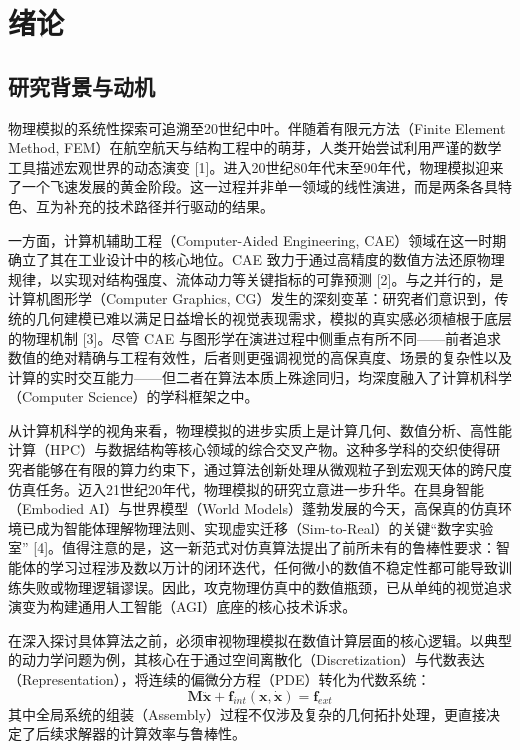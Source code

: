 \chapter{绪论}

\section{研究背景与动机}
物理模拟的系统性探索可追溯至20世纪中叶。伴随着有限元方法（Finite Element Method, FEM）在航空航天与结构工程中的萌芽，人类开始尝试利用严谨的数学工具描述宏观世界的动态演变 [1]。进入20世纪80年代末至90年代，物理模拟迎来了一个飞速发展的黄金阶段。这一过程并非单一领域的线性演进，而是两条各具特色、互为补充的技术路径并行驱动的结果。

一方面，计算机辅助工程（Computer-Aided Engineering, CAE）领域在这一时期确立了其在工业设计中的核心地位。CAE 致力于通过高精度的数值方法还原物理规律，以实现对结构强度、流体动力等关键指标的可靠预测 [2]。与之并行的，是计算机图形学（Computer Graphics, CG）发生的深刻变革：研究者们意识到，传统的几何建模已难以满足日益增长的视觉表现需求，模拟的真实感必须植根于底层的物理机制 [3]。尽管 CAE 与图形学在演进过程中侧重点有所不同——前者追求数值的绝对精确与工程有效性，后者则更强调视觉的高保真度、场景的复杂性以及计算的实时交互能力——但二者在算法本质上殊途同归，均深度融入了计算机科学（Computer Science）的学科框架之中。

从计算机科学的视角来看，物理模拟的进步实质上是计算几何、数值分析、高性能计算（HPC）与数据结构等核心领域的综合交叉产物。这种多学科的交织使得研究者能够在有限的算力约束下，通过算法创新处理从微观粒子到宏观天体的跨尺度仿真任务。迈入21世纪20年代，物理模拟的研究立意进一步升华。在具身智能（Embodied AI）与世界模型（World Models）蓬勃发展的今天，高保真的仿真环境已成为智能体理解物理法则、实现虚实迁移（Sim-to-Real）的关键“数字实验室” [4]。值得注意的是，这一新范式对仿真算法提出了前所未有的鲁棒性要求：智能体的学习过程涉及数以万计的闭环迭代，任何微小的数值不稳定性都可能导致训练失败或物理逻辑谬误。因此，攻克物理仿真中的数值瓶颈，已从单纯的视觉追求演变为构建通用人工智能（AGI）底座的核心技术诉求。

在深入探讨具体算法之前，必须审视物理模拟在数值计算层面的核心逻辑。以典型的动力学问题为例，其核心在于通过空间离散化（Discretization）与代数表达（Representation），将连续的偏微分方程（PDE）转化为代数系统：
\begin{equation}
    \mathbf{M}\mathbf{\ddot{x}} + \mathbf{f}_{int}(\mathbf{x}, \mathbf{\dot{x}}) = \mathbf{f}_{ext}
\end{equation}
其中全局系统的组装（Assembly）过程不仅涉及复杂的几何拓扑处理，更直接决定了后续求解器的计算效率与鲁棒性。

